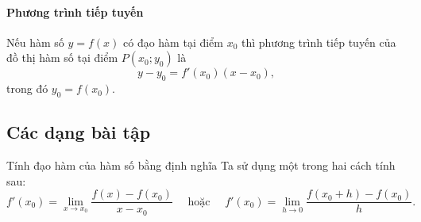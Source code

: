 \begin{bt}
\begin{tomtat}
	\paragraph{Phương trình tiếp tuyến}
	\begin{dn}
	Nếu hàm số $y=f(x)$ có đạo hàm tại điểm $x_0$ thì phương trình tiếp tuyến của đồ thị hàm số tại điểm $P(x_0;y_0)$ là 
	$$y-y_0=f'(x_0)(x-x_0),$$
	trong đó $y_0=f(x_0)$.
	\end{dn}	
\end{tomtat}
\subsection{Các dạng bài tập}
\begin{dang}{Tính đạo hàm của hàm số bằng định nghĩa}
	Ta sử dụng một trong hai cách tính sau:
	\[f'(x_0)=\lim\limits_{x \to x_0} \dfrac{f(x)-f(x_0)}{x-x_0}\quad \text{ hoặc }\quad f'(x_0)=\lim\limits_{h \to 0} \dfrac{f(x_0+h)-f(x_0)}{h}.\]
\end{dang}

\end{bt}
